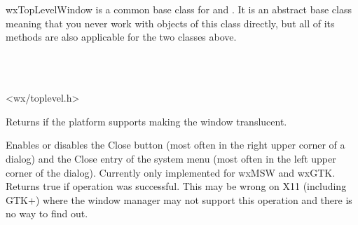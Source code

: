 
\section{}\label{wxtoplevelwindow}

wxTopLevelWindow is a common base class for  and
. It is an abstract base class meaning that you never
work with objects of this class directly, but all of its methods are also
applicable for the two classes above.


\\
\\


<wx/toplevel.h>



\label{wxtoplevelwindowcansettransparent}


Returns \true if the platform supports making the window translucent.




\label{wxtoplevelenableclosebutton}


Enables or disables the Close button (most often in the right
upper corner of a dialog) and the Close entry of the system
menu (most often in the left upper corner of the dialog).
Currently only implemented for wxMSW and wxGTK. Returns
true if operation was successful. This may be wrong on
X11 (including GTK+) where the window manager may not support
this operation and there is no way to find out.

